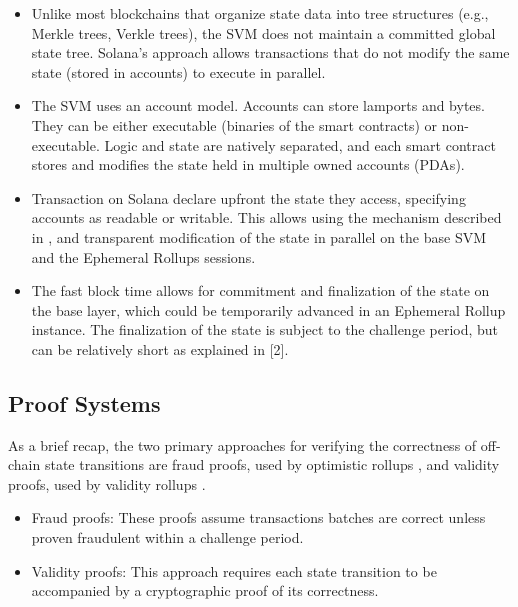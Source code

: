 \documentclass{article}
\begin{document}
\begin{itemize} 

\item Unlike most blockchains that organize state data into tree structures (e.g., Merkle trees, Verkle trees), the SVM does not maintain a committed global state tree. Solana's approach allows transactions that do not modify the same state (stored in accounts) to execute in parallel. 

\item The SVM uses an account model. Accounts can store lamports and bytes. They can be either executable (binaries of the smart contracts) or non-executable. Logic and state are natively separated, and each smart contract stores and modifies the state held in multiple owned accounts (PDAs).

\item Transaction on Solana declare upfront the state they access, specifying accounts as readable or writable. This allows using the mechanism described in \cite{picco2023ephemeral}, and transparent modification of the state in parallel on the base SVM and the Ephemeral Rollups sessions. 

\item The fast block time allows for commitment and finalization of the state on the base layer, which could be temporarily advanced in an Ephemeral Rollup instance.
The finalization of the state is subject to the challenge period, but can be relatively short as explained in [2].

\end{itemize}

\subsection{Proof Systems}
\label{ss:proof-system}

As a brief recap, the two primary approaches for verifying the correctness of off-chain state transitions are fraud proofs, used by optimistic rollups \cite{DBLP:journals/corr/abs-1904-06441}, and validity proofs, used by validity rollups \cite{proofs}.

\begin{itemize}
    \item Fraud proofs: These proofs assume transactions batches are correct unless proven fraudulent within a challenge period. 
    \item Validity proofs: This approach requires each state transition to be accompanied by a cryptographic proof of its correctness. 
\end{itemize}
\end{document}
